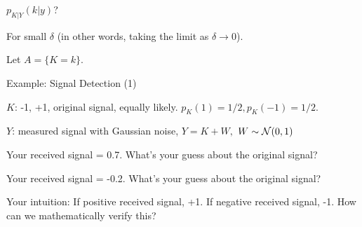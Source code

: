 \begin{frame}{$p_{K|Y}(k|y)$?}


\plitemsep 0.1in

\bci
\item For small $\delta$ (in other words, taking the limit as $\delta \rightarrow 0$).

\medskip
Let $A = \{K=k\}.$

\bigskip
{}


\eci

\end{frame}

\begin{frame}{Example: Signal Detection (1)}



\plitemsep 0.01in
\bci

\item<2-> $K$: -1, +1, original signal, equally likely. $p_{K}(1) = 1/2, p_{K}(-1) = 1/2.$
\item<3-> $Y$: measured signal with Gaussian noise, $Y= K+W,$ $W \sim \mathcal N(0,1)$

\medskip
\item<4-> Your received signal = 0.7. What's your guess about the original signal? 
\item<5-> Your received signal = -0.2. What's your guess about the original signal? 



\medskip
\item<6-> Your intuition: If positive received signal, +1. If negative received signal, -1. How can we mathematically verify this?
\eci
\end{frame}

